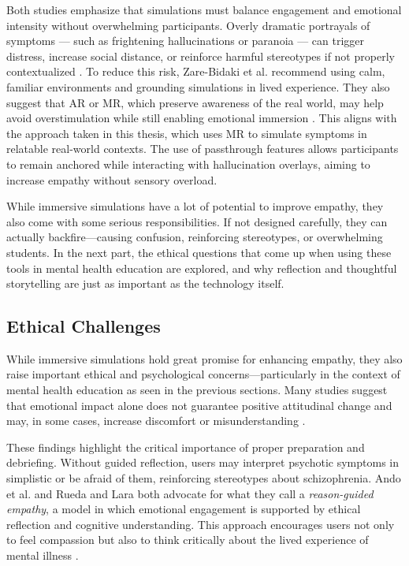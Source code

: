 \vspace{1em}

Both studies emphasize that simulations must balance engagement and emotional intensity without overwhelming participants. Overly dramatic portrayals of symptoms — such as frightening hallucinations or paranoia — can trigger distress, increase social distance, or reinforce harmful stereotypes if not properly contextualized \cite{Ando2011, Chaffin2013, Zare-Bidaki2022}. To reduce this risk, Zare-Bidaki et al. recommend using calm, familiar environments and grounding simulations in lived experience. They also suggest that AR or MR, which preserve awareness of the real world, may help avoid overstimulation while still enabling emotional immersion \cite{Zare-Bidaki2022}. This aligns with the approach taken in this thesis, which uses MR to simulate symptoms in relatable real-world contexts. The use of passthrough features allows participants to remain anchored while interacting with hallucination overlays, aiming to increase empathy without sensory overload.

\vspace{1em}

While immersive simulations have a lot of potential to improve empathy, they also come with some serious responsibilities. If not designed carefully, they can actually backfire—causing confusion, reinforcing stereotypes, or overwhelming students. In the next part, the ethical questions that come up when using these tools in mental health education are explored, and why reflection and thoughtful storytelling are just as important as the technology itself.

\subsection{Ethical Challenges}
\label{sec:ethicalchallenges}

While immersive simulations hold great promise for enhancing empathy, they also raise important ethical and psychological concerns—particularly in the context of mental health education as seen in the previous sections. Many studies suggest that emotional impact alone does not guarantee positive attitudinal change and may, in some cases, increase discomfort or misunderstanding \cite{Ando2011}.

These findings highlight the critical importance of proper preparation and debriefing. Without guided reflection, users may interpret psychotic symptoms in simplistic or be afraid of them, reinforcing stereotypes about schizophrenia. Ando et al. and Rueda and Lara both advocate for what they call a \textit{reason-guided empathy}, a model in which emotional engagement is supported by ethical reflection and cognitive understanding. This approach encourages users not only to feel compassion but also to think critically about the lived experience of mental illness \cite{Ando2011, Rueda2020}. 

